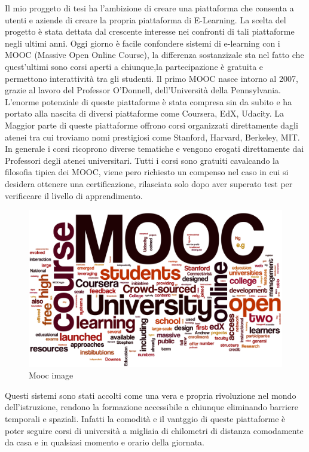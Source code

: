 Il mio proggeto di tesi ha l'ambizione di creare una piattaforma che consenta a utenti e aziende di creare la propria piattaforma di E-Learning.
La scelta del progetto è stata dettata dal crescente interesse nei confronti di tali piattaforme  negli ultimi anni.
Oggi giorno è facile confondere sistemi di e-learning con i MOOC (Massive Open Online Course), la differenza sostanzizale sta nel fatto che quest'ultimi sono corsi aperti a chiunque,la partecipazione è gratuita e permettono interattività tra gli studenti.
Il primo MOOC nasce intorno al 2007, grazie al lavoro del Professor O’Donnell, dell'Università della Pennsylvania.
L'enorme potenziale di queste piattaforme è stata compresa sin da subito e ha portato alla nascita di diversi piattaforme come Coursera, EdX, Udacity.
La Maggior parte di queste piattaforme offrono corsi organizzati direttamente dagli atenei tra cui troviamo nomi prestigiosi come Stanford, Harvard, Berkeley, MIT. In generale i corsi ricoprono diverse tematiche e vengono erogati direttamente dai Professori degli atenei universitari.
Tutti i corsi sono gratuiti cavalcando la filosofia tipica dei MOOC, viene pero richiesto un compenso nel caso in cui si desidera ottenere una certificazione, rilasciata solo dopo aver superato test per verificcare il livello di apprendimento.

\begin{figure}[htb] %
 \centering
 \includegraphics[width=0.8\linewidth]{images/introduction/mooc.png}\hfill
 \caption[Mooc image]{Mooc image}
 \label{fig:fourV}
\end{figure}

Questi sistemi sono stati accolti come una vera e propria rivoluzione nel mondo dell'istruzione, rendono la formazione accessibile a chiunque eliminando barriere temporali e spaziali. Infatti la comodità e il vantggio di queste piattaforme è poter seguire corsi di università a migliaia di chilometri di distanza comodamente da casa e in qualsiasi momento e orario della giornata.

